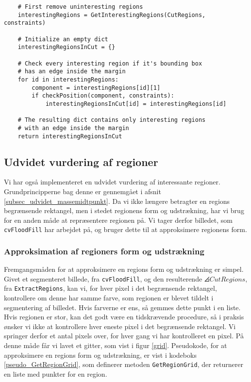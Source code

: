 {\begin{lstlisting}
    # First remove uninteresting regions
    interestingRegions = GetInterestingRegions(CutRegions, constraints)

    # Initialize an empty dict
    interestingRegionsInCut = {}

    # Check every interesting region if it's bounding box
    # has an edge inside the margin
    for id in interestingRegions:
        component = interestingRegions[id][1]
        if checkPosition(component, constraints):
            interestingRegionsInCut[id] = interestingRegions[id]

    # The resulting dict contains only interesting regions
    # with an edge inside the margin
    return interestingRegionsInCut
\end{lstlisting}

\subsection{Udvidet vurdering af regioner}
Vi har også implementeret en udvidet vurdering af interessante
regioner. Grundprincipperne bag denne er gennemgået i afsnit
\ref{subsec_udvidet_massemidtpunkt}. Da vi ikke længere betragter en
regions begrænsende rektangel, men i stedet regionens form og
udstrækning, har vi brug for en anden måde at repræsentere regionen på.
Vi tager derfor billedet, som \texttt{cvFloodFill} har arbejdet på, og
bruger dette til at approksimere regionens form.

\subsubsection{Approksimation af regioners form og udstrækning}
Fremgangsmåden for at approksimere en regions form og udstrækning er
simpel. Givet et segmenteret billede, fra \texttt{cvFloodFill}, og den
resulterende $\angles{CutRegions}$, fra \texttt{ExtractRegions}, kan vi,
for hver pixel i det begrænsende rektangel, kontrollere om denne har
samme farve, som regionen er blevet tildelt i segmentering af billedet.
Hvis farverne er ens, så gemmes dette punkt i en liste. Hvis regionen er
stor, kan det godt være en tidskrævende procedure, så i praksis ønsker
vi ikke at kontrollere hver eneste pixel i det begrænsende rektangel. Vi
springer derfor et antal pixels over, for hver gang vi har kontrolleret
en pixel.  På denne måde får vi lavet et gitter, som vist i figur
\ref{grid}.  Pseudokode, for at approksimere en regions form og
udstrækning, er vist i kodeboks \ref{pseudo_GetRegionGrid}, som
definerer metoden \texttt{GetRegionGrid}, der returnerer en liste med
punkter for en region.

}
